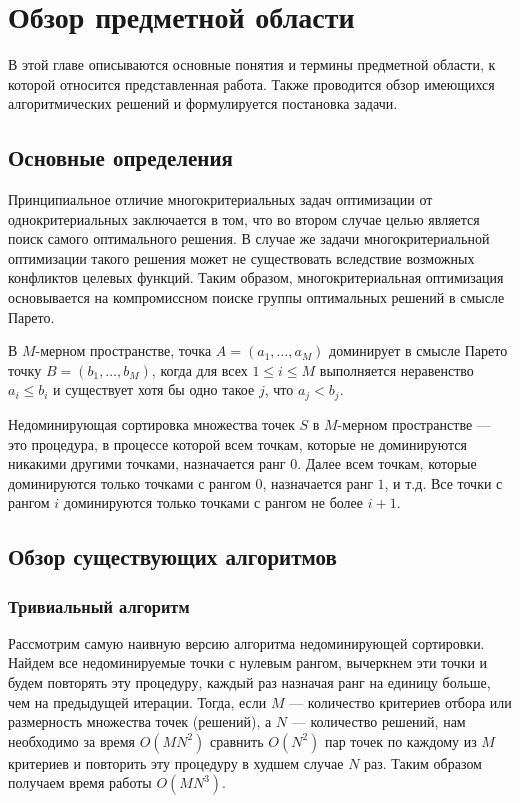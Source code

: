 \chapter{Обзор предметной области}
В этой главе описываются основные понятия и термины предметной области, к которой относится представленная работа. Также проводится обзор имеющихся алгоритмических решений и формулируется постановка задачи.

\section{Основные определения}

Принципиальное отличие многокритериальных задач оптимизации от однокритериальных заключается в том, что во втором случае целью является поиск самого оптимального решения. В случае же задачи многокритериальной оптимизации такого решения может не существовать вследствие возможных конфликтов целевых функций. Таким образом, многокритериальная оптимизация основывается на компромиссном поиске группы оптимальных решений в смысле Парето.
\begin{definition}
    В $M$-мерном пространстве, точка $A = (a_1, \ldots, a_M)$ доминирует в смысле Парето точку $B = (b_1, \ldots, b_M)$, когда для всех $1 \leq i \leq M$ выполняется неравенство $a_i \leq b_i$ и существует хотя бы одно такое $j$, что $a_j < b_j$.
\end{definition}
\begin{definition}
    Недоминирующая сортировка множества точек $S$ в $M$-мерном пространстве --- это процедура, в процессе которой всем точкам, которые не доминируются никакими другими точками, назначается ранг $0$. Далее всем точкам, которые доминируются только точками с рангом $0$, назначается ранг $1$, и т.д. Все точки с рангом $i$ доминируются только точками с рангом не более $i + 1$.
\end{definition}

\section{Обзор существующих алгоритмов}
\subsection{Тривиальный алгоритм}
Рассмотрим самую наивную версию алгоритма недоминирующей сортировки. Найдем все недоминируемые точки с нулевым рангом, вычеркнем эти точки и будем повторять эту процедуру, каждый раз назначая ранг на единицу больше, чем на предыдущей итерации. Тогда, если $M$ --- количество критериев отбора или размерность множества точек (решений), а $N$ --- количество решений, нам необходимо за время $O(MN^2)$ сравнить $O(N^2)$ пар точек по каждому из $M$ критериев и повторить эту процедуру в худшем случае $N$ раз. Таким образом получаем время работы $O(MN^3)$.

